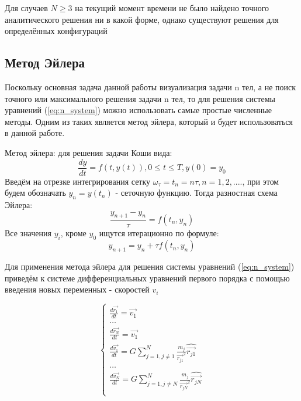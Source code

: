 Для случаев $N \geq 3$ на текущий момент времени не было найдено точного аналитического решения ни в какой форме, однако существуют решения для определённых конфигураций
\subsection{Метод Эйлера}
Поскольку основная задача данной работы визуализация задачи n тел, а не поиск точного или максимального решения задачи n тел, то для решения системы уравнений (\ref{eq:n_system}) можно использовать самые простые численные методы. Одним из таких является метод эйлера, который и будет использоваться в данной работе.

Метод эйлера: для решения задачи Коши вида:
\begin{equation}
	\label{eq:koshi}
	\frac{dy}{dt} = f(t, y(t)), 0 \leq t \leq T, y(0) = y_0
\end{equation}
Введём на отрезке интегрирования сетку $\omega_\tau = {t_n = n\tau, n = 1,2,....}$, при этом будем обозначать $y_n = y(t_n)$  - сеточную функцию.
Тогда разностная схема Эйлера:
\begin{equation}
	\label{eq:euler_frac}
	\frac{y_{n+1} - y_n}{\tau} = f(t_n, y_n)
\end{equation}
Все значения $y_i$, кроме $y_0$ ищутся итерационно по формуле:
\begin{equation}
	\label{eq:euler_formula}
	y_{n+1} = y_n + \tau f(t_n, y_n)
\end{equation}

Для применения метода эйлера для решения системы уравнений (\ref{eq:n_system}) приведём к системе дифференциальных уравнений первого порядка с помощью введения новых переменных - скоростей $v_i$ 

\begin{equation}
	\label{n_system_velocities}
	\begin{cases}
		\frac{d\vec{r_1}}{dt} = \vec{v_1} \\
		\dots \\
		\frac{d\vec{r_N}}{dt} = \vec{v_1} \\
		
		\frac{d\vec{v_1}}{dt} = G\sum_{j=1, j \neq 1}^{N}{\frac{m_j}{\vec{r_{j1}}^2}\hat{\vec{r_{j1}}}} \\
		\dots \\
		\frac{d\vec{v_N}}{dt} = G\sum_{j=1, j \neq N}^{N}{\frac{m_j}{\vec{r_{jN}}^2}\hat{\vec{r_{jN}}}} \\
	\end{cases}
\end{equation}

